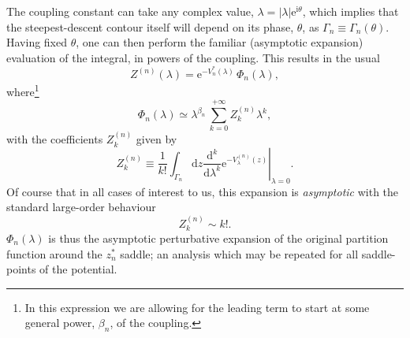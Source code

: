 \documentclass[11pt,a4paper]{article}
\newcommand{\rme}{{\mathrm{e}}}
\newcommand{\rmi}{{\mathrm{i}}}
\newcommand{\rmd}{{\mathrm{d}}}
\begin{document}
The coupling constant can take any complex value, $\lambda = \left|\lambda\right| \rme^{\rmi\theta}$, which implies that the steepest-descent contour itself will depend on its phase, $\theta$, as $\Gamma_{n} \equiv \Gamma_{n} (\theta)$. Having fixed $\theta$, one can then perform the familiar (asymptotic expansion) evaluation of the integral, in powers of the coupling. This results in the usual
%
\begin{equation}
Z^{(n)} (\lambda) = \rme^{- V^*_n (\lambda)}\, \Phi_{n} (\lambda),
\end{equation}
%
\noindent
where\footnote{In this expression we are allowing for the leading term to start at some general power, $\beta_{n}$, of the coupling.}
%
\begin{equation}
\label{eq:Borel-Phi-n-exp}
\Phi_{n} (\lambda) \simeq \lambda^{\beta_{n}}\, \sum_{k=0}^{+\infty} Z_{k}^{(n)} \lambda^{k},
\end{equation}
%
\noindent
with the coefficients $Z_{k}^{(n)}$ given by
%
\begin{equation}
Z_{k}^{(n)} \equiv \frac{1}{k!} \int_{\Gamma_{n}} \rmd z \left. \frac{\rmd^k}{\rmd\lambda^k} \rme^{- V_\lambda^{(n)} (z)} \right|_{\lambda=0}.
\end{equation}
%
\noindent
Of course that in all cases of interest to us, this expansion is \textit{asymptotic} with the standard large-order behaviour
%
\begin{equation}
Z_{k}^{(n)} \sim k!.
\end{equation}
%
\noindent
$\Phi_{n} (\lambda)$ is thus the asymptotic perturbative expansion of the original partition function around the $z^*_{n}$ saddle; an analysis which may be repeated for all saddle-points of the potential.
\end{document}
